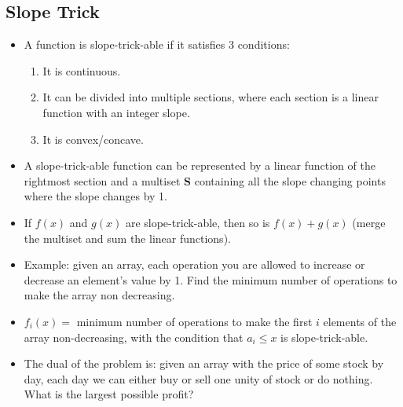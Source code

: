 \subsection{Slope Trick}

\begin{itemize}
    \item A function is slope-trick-able if it satisfies 3 conditions:


\begin{enumerate}
    \item It is continuous.
    \item It can be divided into multiple sections, where each section is a linear function with an integer slope.
    \item It is convex/concave.
\end{enumerate}

\item A slope-trick-able function can be represented by a linear function of the rightmost section and a multiset \textbf{S} containing all the slope changing points where the slope changes by 1.

\item If $f(x)$ and $g(x)$ are slope-trick-able, then so is $f(x) + g(x)$ (merge the multiset and sum the linear functions).

\item Example: given an array, each operation you are allowed to increase or decrease an element's value by 1. Find the minimum number of operations to make the array non decreasing.

\item $f_i(x) = $ minimum number of operations to make the first $i$ elements of the array non-decreasing, with the condition that $a_i \leq x$ is slope-trick-able.

\item  The dual of the problem is: given an array with the price of some stock by day, each day we can either buy or sell one unity of stock or do nothing. What is the largest possible profit?

\end{itemize}
